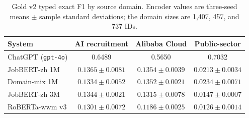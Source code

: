 \begin{table}[htbp]
\caption{Gold v2 typed exact F1 by source domain. Encoder values are three-seed means $\pm$ sample standard deviations; the domain sizes are 1,407, 457, and 737 IDs.}
\label{tab:domain-three-seed}
\centering
\small
\begin{tabular}{lccc}
\toprule
\textbf{System} & \textbf{AI recruitment} & \textbf{Alibaba Cloud} & \textbf{Public-sector} \\
\midrule
ChatGPT (\texttt{gpt-4o}) & 0.6489 & 0.5650 & 0.7032 \\
JobBERT-zh 1M & $0.1365\pm0.0081$ & $0.1354\pm0.0039$ & $0.0213\pm0.0034$ \\
Domain-mix 1M & $0.1334\pm0.0052$ & $0.1352\pm0.0021$ & $0.0234\pm0.0071$ \\
JobBERT-zh 3M & $0.1344\pm0.0021$ & $0.1315\pm0.0078$ & $0.0147\pm0.0007$ \\
RoBERTa-wwm v3 & $0.1301\pm0.0072$ & $0.1186\pm0.0025$ & $0.0126\pm0.0014$ \\
\bottomrule
\end{tabular}
\end{table}
